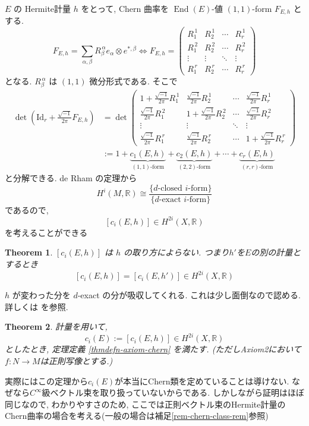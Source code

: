 \documentclass[dvipdfmx,a4paper,11pt]{article} %
\newtheorem{thm}{Theorem}[section]
\theoremstyle{definition}
\theoremstyle{remark}
\numberwithin{equation}{section}
\newcommand{\End}[0]{\operatorname{End}}
\newcommand{\R}{\mathbb{R}}
\begin{document}
\(E\) の Hermite計量 \(h\) をとって, Chern 曲率を \(\End(E)\)-値 \((1,1)\)-form \(F_{E,h}\) とする.
\[
F_{E,h}=
\sum_{\alpha,\beta}R_\beta^{\,\alpha}e_{\alpha} \otimes e^{*,\beta}
\Leftrightarrow 
F_{E,h}
=
\begin{pmatrix}
R_1^{\,1} & R_2^{\,1}& \cdots & R_r^{\,1}\\
R_1^{\,2}&R_2^{\,2}& \cdots & R_r^{\,2}\\
\vdots & \vdots & \ddots & \vdots\\
R_1^{\,r}&R_2^{\,r}& \cdots &R_r^{\,r}
\end{pmatrix}
\]
となる. \(R_\beta^{\,\alpha}\) は \((1,1)\) 微分形式である. そこで
\begin{equation}
\begin{aligned}
\det\left(\mathrm{Id}_r+\frac{\sqrt{-1}}{2\pi }F_{E,h}\right)
&=\det
\begin{pmatrix}
1+\frac{\sqrt{-1}}{2\pi }R_1^{\,1} & \frac{\sqrt{-1}}{2\pi }R_2^{\,1}& \cdots &\frac{\sqrt{-1}}{2\pi } R_r^{\,1}\\
\frac{\sqrt{-1}}{2\pi }R_1^{\,2}&1+\frac{\sqrt{-1}}{2\pi }R_2^{\,2}& \cdots & \frac{\sqrt{-1}}{2\pi }R_r^{\,2}\\
\vdots & \vdots & \ddots & \vdots\\
\frac{\sqrt{-1}}{2\pi }R_1^{\,r}&\frac{\sqrt{-1}}{2\pi }R_2^{\,r}& \cdots &1+\frac{\sqrt{-1}}{2\pi }R_r^{\,r}
\end{pmatrix}
\\
&:=1+\underbrace{c_1(E, h)}_{\text{\((1,1)\)-form}}+
\underbrace{c_2(E, h)}_{\text{\((2,2)\)-form}}+\cdots+
\underbrace{c_r(E, h)}_{\text{\((r,r)\)-form}}
\end{aligned}
\end{equation}
と分解できる. de Rham の定理から
\[
H^{i}(M, \R) \cong \frac{ \{ \text{\(d\)-closed \(i\)-form}\}}{\{ \text{\(d\)-exact \(i\)-form}\}}
\]
であるので,
\[
[c_i(E, h)] \in H^{2i}(X, \R)
\]
を考えることができる
\begin{thm}
\([c_i(E, h)] \) は \(h\) の取り方によらない.
つまり$h'$を$E$の別の計量とするとき
$$
[c_i(E, h)] = [c_i(E, h')]  \in H^{2i}(X, \R)
$$
\end{thm}
\(h\) が変わった分を \(d\)-exact の分が吸収してくれる. これは少し面倒なので認める. 詳しくは \cite[Ch.2 (2.2.5)]{Kob14} を参照.

\begin{thm}
計量を用いて,
\[
c_i(E):=[c_i(E, h)] \in H^{2i}(X, \R)
\]
としたとき, 定理定義 \ref{thmdefn-axiom-chern} を満たす.
(ただしAxiom2において$f : N \to M$は正則写像とする.)
\end{thm}
実際にはこの定理から$c_i(E)$が本当にChern類を定めていることは導けない. 
なぜなら$C^\infty$級ベクトル束を取り扱っていないからである. 
しかしながら証明はほぼ同じなので, わかりやすさのため, ここでは正則ベクトル束のHermite計量のChern曲率の場合を考える(一般の場合は補足\ref{rem-chern-class-rem}参照)
\end{document}
